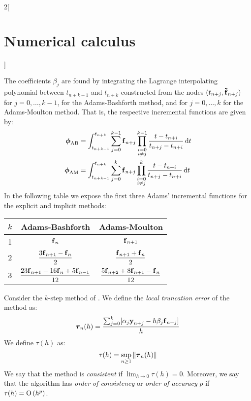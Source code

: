 \documentclass[../../../main_math.tex]{subfiles}
\begin{document}
\begin{multicols}{2}[\section{Numerical calculus}]
\begin{definition}
    The coefficients $\beta_j$ are found by integrating the Lagrange interpolating polynomial between $t_{n+k-1}$ and $t_{n+k}$ constructed from the nodes $(t_{n+j},\boldsymbol{\mathrm{\tilde{f}}}_{n+j})$ for $j=0,\ldots,k-1$, for the Adams-Bashforth method, and for $j=0,\ldots,k$ for the Adams-Moulton method. That is, the respective incremental functions are given by:
    \begin{align*}
      \boldsymbol{\mathrm{\phi}}_\mathrm{AB} & =\int_{t_{n+k-1}}^{t_{n+k}}\sum_{j=0}^{k-1}\boldsymbol{\mathrm{f}}_{n+j}\prod_{\substack{i=0 \\i\ne j}}^{k-1}\frac{t-t_{n+i}}{t_{n+j}-t_{n+i}}\dd{t}\\
      \boldsymbol{\mathrm{\phi}}_\mathrm{AM} & =\int_{t_{n+k-1}}^{t_{n+k}}\sum_{j=0}^{k}\boldsymbol{\mathrm{f}}_{n+j}\prod_{\substack{i=0   \\i\ne j}}^{k}\frac{t-t_{n+i}}{t_{n+j}-t_{n+i}}\dd{t}
    \end{align*}
    In the following table we expose the first three Adams' incremental functions for the explicit and implicit methods:
    \begin{center}
      \renewcommand{\arraystretch}{1.7}
      \begin{tabular}[ht]{c|c|c}
        $k$ & Adams-Bashforth                                                   & Adams-Moulton                                                  \\
        \hline
        1   & $\boldsymbol{\mathrm{f}}_n$                                                        & $\boldsymbol{\mathrm{f}}_{n+1}$                                                 \\
        2   & $\displaystyle\frac{3\boldsymbol{\mathrm{f}}_{n+1}-\boldsymbol{\mathrm{f}}_n}{2}$                   & $\displaystyle\frac{\boldsymbol{\mathrm{f}}_{n+1}+\boldsymbol{\mathrm{f}}_n}{2}$                 \\
        3   & $\displaystyle\frac{23\boldsymbol{\mathrm{f}}_{n+1}-16\boldsymbol{\mathrm{f}}_n+5\boldsymbol{\mathrm{f}}_{n-1}}{12}$ & $\displaystyle\frac{5\boldsymbol{\mathrm{f}}_{n+2}+8\boldsymbol{\mathrm{f}}_{n+1}-\boldsymbol{\mathrm{f}}_n}{12}$ \\
      \end{tabular}
    \end{center}
  \end{definition}
  \begin{definition}
    Consider the $k$-step method of . We define the \emph{local truncation error} of the method as:
    $$
      \boldsymbol{\mathrm{\tau}}_n(h)=\frac{\sum_{j=0}^k[\alpha_j\boldsymbol{\mathrm{y}}_{n+j}-h\beta_j\boldsymbol{\mathrm{{f}}}_{n+j}]}{h}
    $$
    We define $\tau(h)$ as:
    $$
      \tau(h)=\sup_{n\geq 1}\left\|\boldsymbol{\mathrm{\tau}}_n(h)\right\|
    $$
    We say that the method is \emph{consistent} if $\displaystyle\lim_{h\to 0}\tau(h)=0$. Moreover, we say that the algorithm has \emph{order of consistency} or \emph{order of accuracy} $p$ if $\tau(h)=\mathrm{O}\left(h^p\right)$.

\end{definition}
\end{multicols}
\end{document}
